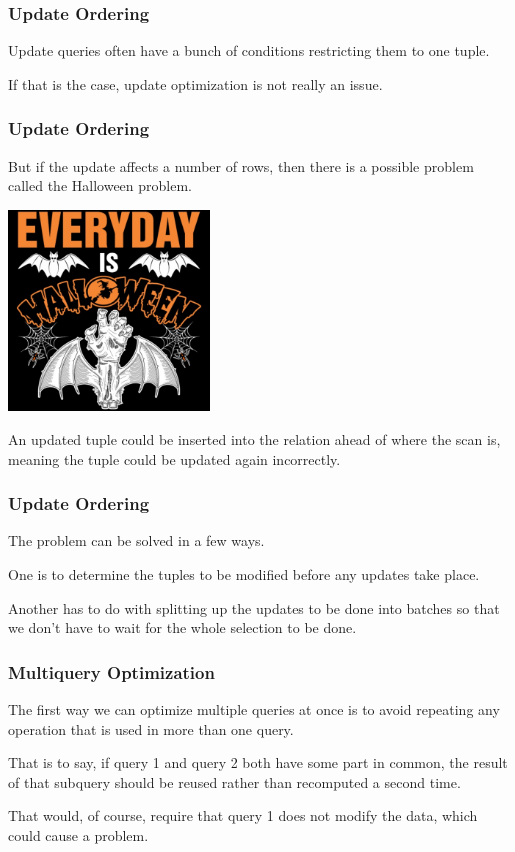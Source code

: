 \begin{frame}
\frametitle{Update Ordering}

Update queries often have a bunch of conditions restricting them to one tuple. 

If that is the case, update optimization is not really an issue. 

\end{frame}


\begin{frame}
\frametitle{Update Ordering}

But if the update affects a number of rows, then there is a possible problem called the \alert{Halloween problem}.

\begin{center}
	\includegraphics[width=0.4\textwidth]{images/everyday.jpg}
\end{center}


An updated tuple could be inserted into the relation ahead of where the scan is, meaning the tuple could be updated again incorrectly. 

\end{frame}

\begin{frame}
\frametitle{Update Ordering}

The problem can be solved in a few ways. 

One is to determine the tuples to be modified before any updates take place. 

Another has to do with splitting up the updates to be done into batches so that we don't have to wait for the whole selection to be done.


\end{frame}


\begin{frame}
\frametitle{Multiquery Optimization}

The first way we can optimize multiple queries at once is to avoid repeating any operation that is used in more than one query. 

That is to say, if query 1 and query 2 both have some part in common, the result of that subquery should be reused rather than recomputed a second time. 

That would, of course, require that query 1 does not modify the data, which could cause a problem.

\end{frame}

